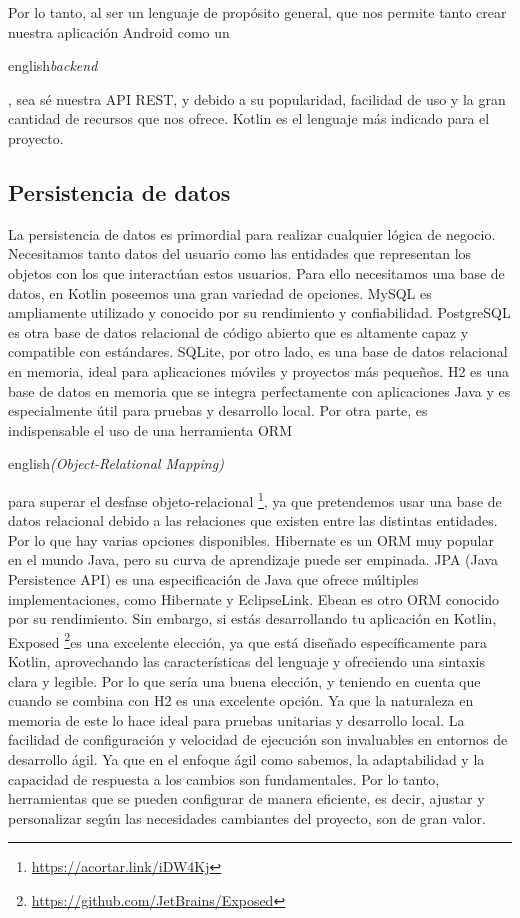 Por lo tanto, al ser un lenguaje de propósito general, que nos permite tanto crear nuestra aplicación Android como un \begin{otherlanguage}
{english}\textit{backend}\end{otherlanguage}, sea sé nuestra API REST, y debido a su popularidad, facilidad de uso y la gran cantidad de recursos que nos ofrece. Kotlin es el lenguaje más indicado para el proyecto.

\subsection{Persistencia de datos}

La persistencia de datos es primordial para realizar cualquier lógica de negocio. Necesitamos tanto datos del usuario como las entidades que representan los objetos con los que interactúan estos usuarios. Para ello necesitamos una base de datos, en Kotlin poseemos una gran variedad de opciones. MySQL es ampliamente utilizado y conocido por su rendimiento y confiabilidad. PostgreSQL es otra base de datos relacional de código abierto que es altamente capaz y compatible con estándares. SQLite, por otro lado, es una base de datos relacional en memoria, ideal para aplicaciones móviles y proyectos más pequeños. H2 es una base de datos en memoria que se integra perfectamente con aplicaciones Java y es especialmente útil para pruebas y desarrollo local. Por otra parte, es indispensable el uso de una herramienta ORM \begin{otherlanguage}
{english}\textit{(Object-Relational Mapping)}\end{otherlanguage} para superar el desfase objeto-relacional \footnote{\url{https://acortar.link/iDW4Kj}}, ya que pretendemos usar una base de datos relacional debido a las relaciones que existen entre las distintas entidades. Por lo que hay varias opciones disponibles. Hibernate es un ORM muy popular en el mundo Java, pero su curva de aprendizaje puede ser empinada. JPA (Java Persistence API) es una especificación de Java que ofrece múltiples implementaciones, como Hibernate y EclipseLink. Ebean es otro ORM conocido por su rendimiento. Sin embargo, si estás desarrollando tu aplicación en Kotlin, Exposed \footnote{\url{https://github.com/JetBrains/Exposed}}es una excelente elección, ya que está diseñado específicamente para Kotlin, aprovechando las características del lenguaje y ofreciendo una sintaxis clara y legible. Por lo que sería una buena elección, y teniendo en cuenta que cuando se combina con  H2 es una excelente opción. Ya que la naturaleza en memoria de este lo hace ideal para pruebas unitarias y desarrollo local. La facilidad de configuración y velocidad de ejecución son invaluables en entornos de desarrollo ágil. Ya que en el enfoque ágil como sabemos, la adaptabilidad y la capacidad de respuesta a los cambios son fundamentales. Por lo tanto, herramientas que se pueden configurar de manera eficiente, es decir, ajustar y personalizar según las necesidades cambiantes del proyecto, son de gran valor.

